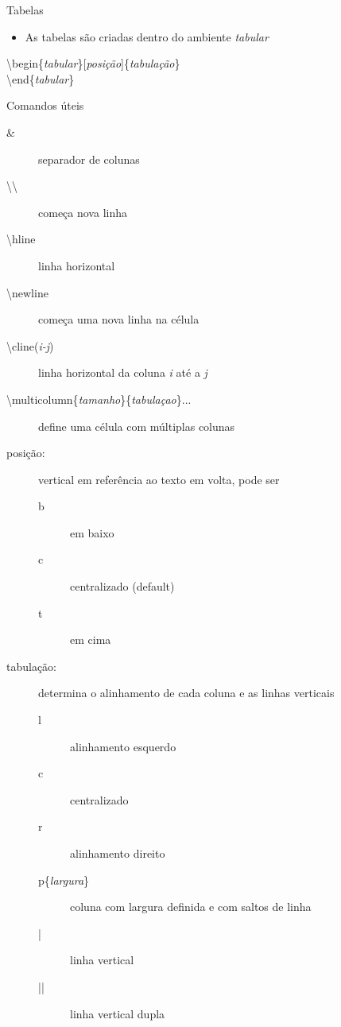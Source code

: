 \begin{frame}[allowframebreaks]{Tabelas}
    \begin{itemize}
    \item As tabelas são criadas dentro do ambiente \textit{tabular}
    \end{itemize}

    \alert{\textbackslash begin\{\textit{tabular}\}[\textit{posição}]\{\textit{tabulação}\} \\
           \textbackslash end\{\textit{tabular}\}
          }

    \begin{block}{Comandos úteis}
        \begin{description}
        \item[\&] separador de colunas
        \item[\textbackslash\textbackslash] começa nova linha
        \item[\textbackslash hline] linha horizontal
        \item[\textbackslash newline] começa uma nova linha na célula
        \item[\textbackslash cline(\textit{i-j})] linha horizontal da coluna \textit{i} até a \textit{j}
        \item[\textbackslash multicolumn\{\textit{tamanho}\}\{\textit{tabulaçao}\}{...}] define uma célula com múltiplas colunas
        \end{description}
    \end{block}

    \newpage
    
    \begin{description}
    \item[posição:] vertical em referência ao texto em volta, pode ser
        \begin{description}
        \item[b] em baixo
        \item[c] centralizado (default)
        \item[t] em cima
        \end{description}
    \item[tabulação:] determina o alinhamento de cada coluna e as linhas verticais
        \begin{description}
        \item[l] alinhamento esquerdo
        \item[c] centralizado
        \item[r] alinhamento direito
        \item[p\{\textit{largura}\}] coluna com largura definida e com saltos de linha
        \item[|] linha vertical
        \item[||] linha vertical dupla
        \end{description}
    \end{description}
\end{frame}

